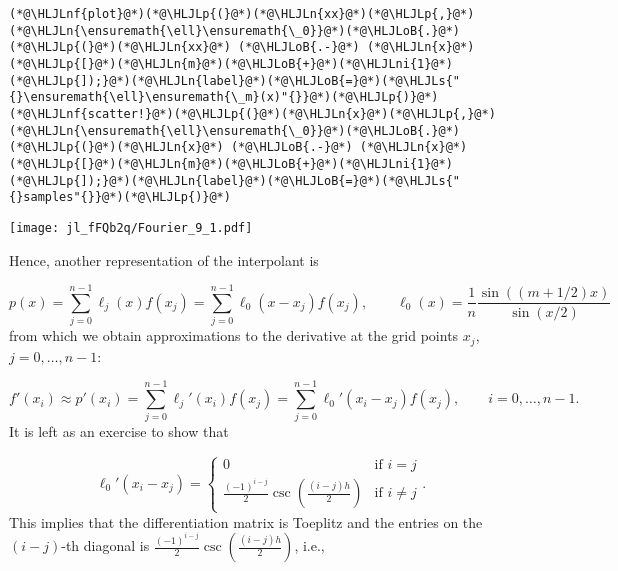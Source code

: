 \documentclass[12pt,a4paper]{article}
\newcommand{\HLJLn}[1]{#1}
\newcommand{\HLJLnf}[1]{\textcolor[RGB]{66,102,213}{#1}}
\newcommand{\HLJLs}[1]{\textcolor[RGB]{201,61,57}{#1}}
\newcommand{\HLJLni}[1]{\textcolor[RGB]{59,151,46}{#1}}
\newcommand{\HLJLoB}[1]{\textcolor[RGB]{102,102,102}{\textbf{#1}}}
\newcommand{\HLJLp}[1]{#1}
\begin{document}
\begin{lstlisting}
(*@\HLJLnf{plot}@*)(*@\HLJLp{(}@*)(*@\HLJLn{xx}@*)(*@\HLJLp{,}@*)(*@\HLJLn{\ensuremath{\ell}\ensuremath{\_0}}@*)(*@\HLJLoB{.}@*)(*@\HLJLp{(}@*)(*@\HLJLn{xx}@*) (*@\HLJLoB{.-}@*) (*@\HLJLn{x}@*)(*@\HLJLp{[}@*)(*@\HLJLn{m}@*)(*@\HLJLoB{+}@*)(*@\HLJLni{1}@*)(*@\HLJLp{]);}@*)(*@\HLJLn{label}@*)(*@\HLJLoB{=}@*)(*@\HLJLs{"{}\ensuremath{\ell}\ensuremath{\_m}(x)"{}}@*)(*@\HLJLp{)}@*)
(*@\HLJLnf{scatter!}@*)(*@\HLJLp{(}@*)(*@\HLJLn{x}@*)(*@\HLJLp{,}@*)(*@\HLJLn{\ensuremath{\ell}\ensuremath{\_0}}@*)(*@\HLJLoB{.}@*)(*@\HLJLp{(}@*)(*@\HLJLn{x}@*) (*@\HLJLoB{.-}@*) (*@\HLJLn{x}@*)(*@\HLJLp{[}@*)(*@\HLJLn{m}@*)(*@\HLJLoB{+}@*)(*@\HLJLni{1}@*)(*@\HLJLp{]);}@*)(*@\HLJLn{label}@*)(*@\HLJLoB{=}@*)(*@\HLJLs{"{}samples"{}}@*)(*@\HLJLp{)}@*)
\end{lstlisting}

\texttt{[image: jl\_fFQb2q/Fourier\_9\_1.pdf]}

Hence, another representation of the interpolant is

\[
p(x) = \sum_{j=0}^{n-1}\ell_j(x)f(x_j) = \sum_{j=0}^{n-1}\ell_0(x-x_j)f(x_j), \qquad \ell_0(x) = \frac{1}{n}\frac{\sin((m+1/2)x)}{\sin(x/2)}
\]
from which we obtain approximations to the derivative at the grid points $x_j$, $j = 0, \ldots, n-1$:

\[
f'(x_i) \approx p'(x_i) = \sum_{j=0}^{n-1}\ell_{j}'(x_i) f(x_{j})  = \sum_{j=0}^{n-1}\ell_{0}'(x_i-x_j)f(x_{j}), \qquad i = 0, \ldots, n-1.
\]
It is left as an exercise to show that

\[
\ell_{0}'(x_i-x_j) = \begin{cases}
 0 & \text{if } i = j \\
 \frac{(-1)^{i-j}}{2}\csc\left( \frac{(i-j)h}{2} \right)  & \text{if } i\neq j
\end{cases}.
\]
This implies that the differentiation matrix is Toeplitz and the entries on the $(i-j)$-th diagonal is $\frac{(-1)^{i-j}}{2}\csc\left( \frac{(i-j)h}{2} \right)$, i.e.,
\end{document}
